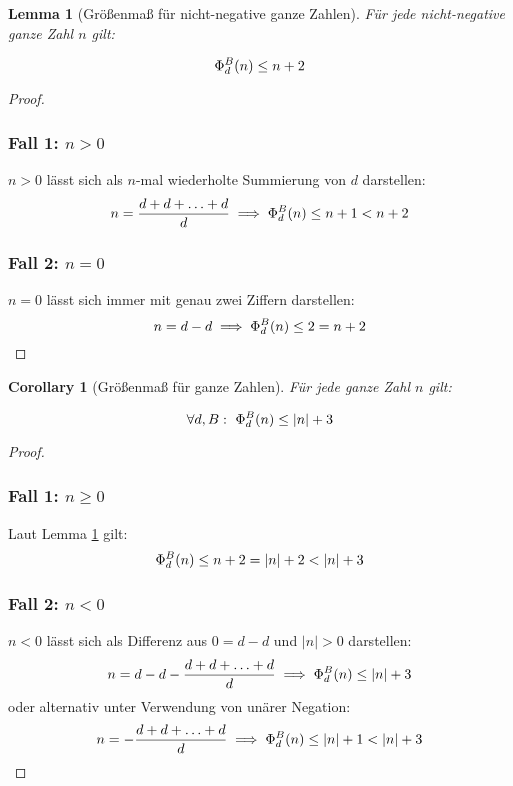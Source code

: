 \documentclass{article}
\newtheorem{corollary}{Corollary}[theorem]
\newtheorem{lemma}[theorem]{Lemma}
\theoremstyle{nonumberplain}
\newtheorem{proof}{Beweis}
\begin{document}
\begin{lemma}[Größenmaß für nicht-negative ganze Zahlen]\label{lemma:measure_linear_nonnegative}
    Für jede nicht-negative ganze Zahl \(n\) gilt:

    \[\Phi_{d}^{B}(n) \leq n + 2\]
\end{lemma}
\begin{proof}
    \subsubsection*{Fall 1: \(n > 0\)}
    
    \(n > 0\) lässt sich als \(n\)-mal wiederholte Summierung von \(d\) darstellen:
    \[n = \frac{d+d+\ldots+d}{d} \implies \Phi_{d}^{B}(n) \leq n + 1 < n + 2\]

    \subsubsection*{Fall 2: \(n = 0\)}
        
    \(n = 0\) lässt sich immer mit genau zwei Ziffern darstellen:
    \[n = d - d \implies \Phi_{d}^{B}(n) \leq 2 = n + 2\]
\end{proof}
\begin{corollary}[Größenmaß für ganze Zahlen]\label{lemma:measure_linear}
    Für jede ganze Zahl \(n\) gilt:

    \[\forall d, B:\  \Phi_{d}^{B}(n) \leq |n| + 3\]
\end{corollary}

\begin{proof}
    \subsubsection*{Fall 1: \(n \geq 0\)}

    Laut Lemma \ref{lemma:measure_linear_nonnegative} gilt:
    \[\Phi_{d}^{B}(n) \leq n + 2 = |n| + 2 < |n| + 3\]

    \subsubsection*{Fall 2: \(n < 0\)}
        
    \(n < 0\) lässt sich als Differenz aus \(0 = d-d\) und \(|n| > 0\) darstellen:
    \[n = d - d - \frac{d+d+\ldots+d}{d} \implies \Phi_{d}^{B}(n) \leq |n| + 3\]
    oder alternativ unter Verwendung von unärer Negation:
    \[n = -\frac{d+d+\ldots+d}{d} \implies \Phi_{d}^{B}(n) \leq |n| + 1 < |n| + 3\]
\end{proof}
\end{document}

